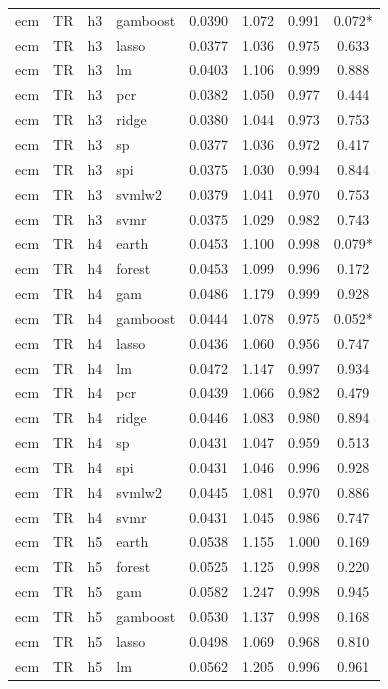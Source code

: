 \begin{ThreePartTable}
\begin{longtable}[t]{llclcccc}
ecm & TR & h3 & gamboost & 0.0390 & 1.072 & 0.991 & 0.072*\\
ecm & TR & h3 & lasso & 0.0377 & 1.036 & 0.975 & 0.633\\
ecm & TR & h3 & lm & 0.0403 & 1.106 & 0.999 & 0.888\\
ecm & TR & h3 & pcr & 0.0382 & 1.050 & 0.977 & 0.444\\
ecm & TR & h3 & ridge & 0.0380 & 1.044 & 0.973 & 0.753\\
ecm & TR & h3 & sp & 0.0377 & 1.036 & 0.972 & 0.417\\
ecm & TR & h3 & spi & 0.0375 & 1.030 & 0.994 & 0.844\\
ecm & TR & h3 & svmlw2 & 0.0379 & 1.041 & 0.970 & 0.753\\
ecm & TR & h3 & svmr & 0.0375 & 1.029 & 0.982 & 0.743\\
\addlinespace
ecm & TR & h4 & earth & 0.0453 & 1.100 & 0.998 & 0.079*\\
ecm & TR & h4 & forest & 0.0453 & 1.099 & 0.996 & 0.172\\
ecm & TR & h4 & gam & 0.0486 & 1.179 & 0.999 & 0.928\\
ecm & TR & h4 & gamboost & 0.0444 & 1.078 & 0.975 & 0.052*\\
ecm & TR & h4 & lasso & 0.0436 & 1.060 & 0.956 & 0.747\\
ecm & TR & h4 & lm & 0.0472 & 1.147 & 0.997 & 0.934\\
ecm & TR & h4 & pcr & 0.0439 & 1.066 & 0.982 & 0.479\\
ecm & TR & h4 & ridge & 0.0446 & 1.083 & 0.980 & 0.894\\
ecm & TR & h4 & sp & 0.0431 & 1.047 & 0.959 & 0.513\\
ecm & TR & h4 & spi & 0.0431 & 1.046 & 0.996 & 0.928\\
ecm & TR & h4 & svmlw2 & 0.0445 & 1.081 & 0.970 & 0.886\\
ecm & TR & h4 & svmr & 0.0431 & 1.045 & 0.986 & 0.747\\
\addlinespace
ecm & TR & h5 & earth & 0.0538 & 1.155 & 1.000 & 0.169\\
ecm & TR & h5 & forest & 0.0525 & 1.125 & 0.998 & 0.220\\
ecm & TR & h5 & gam & 0.0582 & 1.247 & 0.998 & 0.945\\
ecm & TR & h5 & gamboost & 0.0530 & 1.137 & 0.998 & 0.168\\
ecm & TR & h5 & lasso & 0.0498 & 1.069 & 0.968 & 0.810\\
ecm & TR & h5 & lm & 0.0562 & 1.205 & 0.996 & 0.961\\

\end{longtable}
\end{ThreePartTable}
